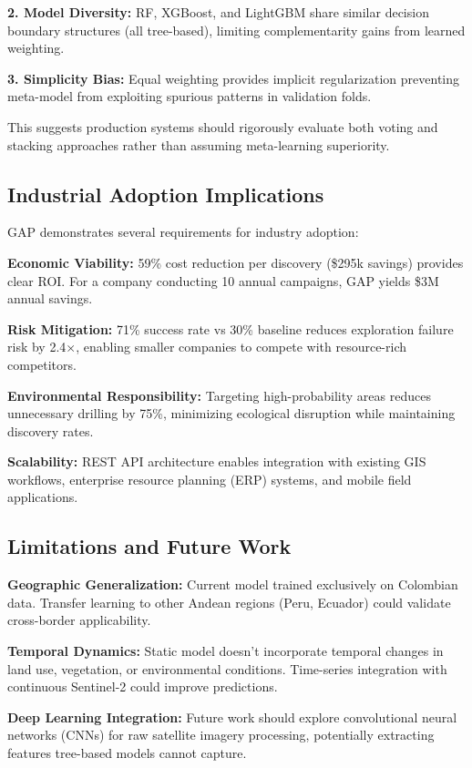 \documentclass[12pt,a4paper]{article}
\begin{document}
\textbf{2. Model Diversity:} RF, XGBoost, and LightGBM share similar decision boundary structures (all tree-based), limiting complementarity gains from learned weighting.

\textbf{3. Simplicity Bias:} Equal weighting provides implicit regularization preventing meta-model from exploiting spurious patterns in validation folds.

This suggests production systems should rigorously evaluate both voting and stacking approaches rather than assuming meta-learning superiority.

\subsection{Industrial Adoption Implications}

GAP demonstrates several requirements for industry adoption:

\textbf{Economic Viability:} 59\% cost reduction per discovery (\$295k savings) provides clear ROI. For a company conducting 10 annual campaigns, GAP yields \$3M annual savings.

\textbf{Risk Mitigation:} 71\% success rate vs 30\% baseline reduces exploration failure risk by 2.4$\times$, enabling smaller companies to compete with resource-rich competitors.

\textbf{Environmental Responsibility:} Targeting high-probability areas reduces unnecessary drilling by 75\%, minimizing ecological disruption while maintaining discovery rates.

\textbf{Scalability:} REST API architecture enables integration with existing GIS workflows, enterprise resource planning (ERP) systems, and mobile field applications.

\subsection{Limitations and Future Work}

\textbf{Geographic Generalization:} Current model trained exclusively on Colombian data. Transfer learning to other Andean regions (Peru, Ecuador) could validate cross-border applicability.

\textbf{Temporal Dynamics:} Static model doesn't incorporate temporal changes in land use, vegetation, or environmental conditions. Time-series integration with continuous Sentinel-2 could improve predictions.

\textbf{Deep Learning Integration:} Future work should explore convolutional neural networks (CNNs) for raw satellite imagery processing, potentially extracting features tree-based models cannot capture.
\end{document}
